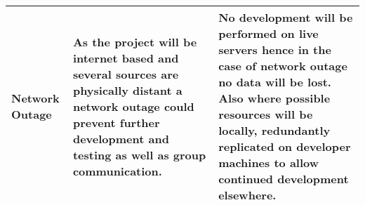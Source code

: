\begin{center}
\begin{landscape}
\begin{longtable}{|p{3cm}|p{7cm}|p{12cm}|}
        Network Outage                                   & As the project will be internet based and several sources are physically distant a network outage could prevent further development and testing as well as group communication.                                                                                                                                                                                              & No development will be performed on live servers hence in the case of network outage no data will be lost. Also where possible resources will be locally, redundantly replicated on developer machines to allow continued development elsewhere.                                                                                                                                                                                                                                                                                                                                                                                                                                                                                                                                                                                                                                                                                                                                                                                         \\
        \hline
    \end{longtable}
    \end{landscape}
\end{center}